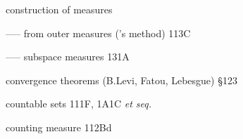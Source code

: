 





construction of measures



----- from outer measures (\Caratheodory's method) 113C

----- subspace measures 131A






































convergence theorems (B.Levi, Fatou, Lebesgue) \S123









































countable sets 111F, 1A1C {\it et seq.}










counting measure 112Bd












